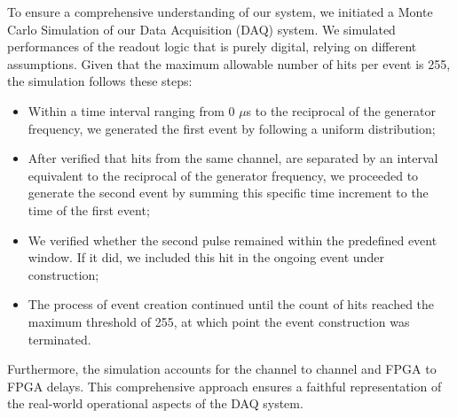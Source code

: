 To ensure a comprehensive understanding of our system, we initiated a Monte Carlo Simulation of our Data Acquisition (DAQ) system. 
We simulated performances of the readout logic that is purely digital, relying on different assumptions.
Given that the maximum allowable number of hits per event is 255, the simulation follows these steps:
\begin{itemize}
  \item Within a time interval ranging from 0 $\mu$s to the reciprocal of the generator frequency, we generated the first event by following a uniform distribution;
    \item After verified that hits from the same channel, are separated by an interval equivalent to the reciprocal of the generator frequency, we proceeded to generate the second event by summing this specific time increment to the time of the first event;
      \item We verified whether the second pulse remained within the predefined event window. If it did, we included this hit in the ongoing event under construction;
      \item The process of event creation continued until the count of hits reached the maximum threshold of 255, at which point the event construction was terminated.
\end{itemize}
Furthermore, the simulation accounts for the channel to channel and FPGA to FPGA delays. 
This comprehensive approach ensures a faithful representation of the real-world operational aspects of the DAQ system.




